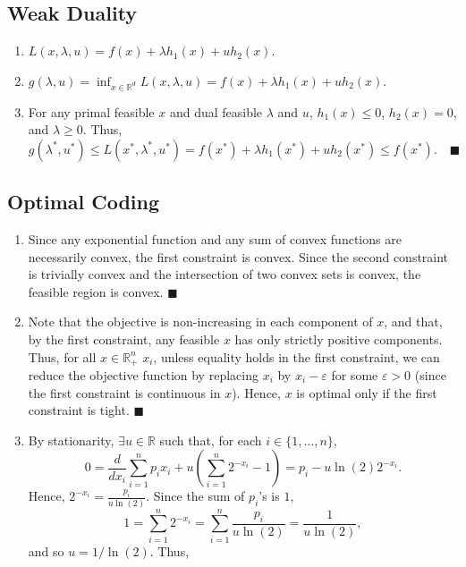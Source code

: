 \documentclass[11pt]{article}
\renewcommand{\qed}{\quad \ensuremath{\blacksquare}}
\newcommand{\R}{\mathbb{R}} %
\newcommand{\e}{\varepsilon} %
\begin{document}
\subsection{Weak Duality}
\begin{enumerate}
\item
$L(x,\lambda,u) = f(x) + \lambda h_1(x) + u h_2(x)$.
\item
$\displaystyle g(\lambda,u)
    = \inf_{x \in \R^d} L(x,\lambda,u)
    = f(x) + \lambda h_1(x) + u h_2(x)$.
\item For any primal feasible $x$ and dual feasible $\lambda$ and $u$,
$h_1(x) \leq 0$, $h_2(x) = 0$, and $\lambda \geq 0$. Thus,
\[g(\lambda^*,u^*)
    \leq L(x^*, \lambda^*, u^*)
    = f(x^*) + \lambda h_1(x^*) + u h_2(x^*)
    \leq f(x^*). \qed
\]
\end{enumerate}

\subsection{Optimal Coding}
\begin{enumerate}
\item Since any exponential function and any sum of convex functions are
necessarily convex, the first constraint is convex. Since the second constraint
is trivially convex and the intersection of two convex sets is convex, the
feasible region is convex. \qed

\item Note that the objective is non-increasing in each component of $x$, and
that, by the first constraint, any feasible $x$ has only strictly positive
components. Thus, for all $x \in \R_+^n$ $x_i$, unless equality holds in the
first constraint, we can reduce the objective function by replacing $x_i$ by
$x_i - \e$ for some $\e > 0$ (since the first constraint is continuous in $x$).
Hence, $x$ is optimal only if the first constraint is tight. \qed

\item By stationarity, $\exists u \in \R$ such that, for each
$i \in \{1,\dots,n\}$,
\[0
    = \frac{d}{dx_i} \sum_{i = 1}^n p_i x_i
                        + u \left( \sum_{i = 1}^n 2^{-x_i} - 1\right)
    = p_i - u \ln(2) 2^{-x_i}.
\]
Hence, $2^{-x_i} = \frac{p_i}{u \ln(2)}$. Since the sum of $p_i$'s is $1$,
\[1
    = \sum_{i = 1}^n 2^{-x_i}
    = \sum_{i = 1}^n \frac{p_i}{u \ln(2)} = \frac{1}{u \ln(2)},
\]
and so $u = 1/\ln(2)$. Thus, 
\end{enumerate}
\end{document}
